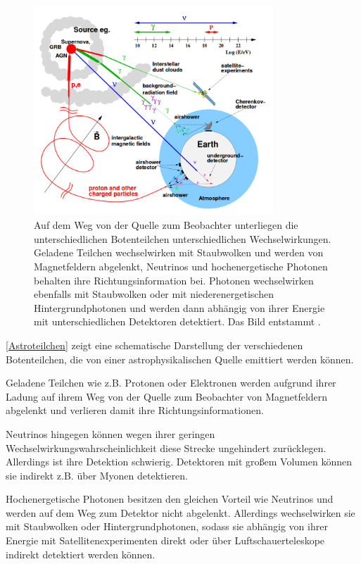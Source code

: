 \begin{figure}
    \centering
    \includegraphics[width=0.8\textwidth]{./Plots/02_Astroteilchenphysik/Astroteilchen.png}
    \caption{Auf dem Weg von der Quelle zum Beobachter unterliegen die unterschiedlichen Botenteilchen unterschiedlichen Wechselwirkungen. 
    Geladene Teilchen wechselwirken mit Staubwolken und werden von Magnetfeldern abgelenkt, Neutrinos und hochenergetische Photonen behalten ihre Richtungsinformation bei.
    Photonen wechselwirken ebenfalls mit Staubwolken oder mit niederenergetischen Hintergrundphotonen und werden dann abhängig von ihrer Energie mit unterschiedlichen Detektoren detektiert. 
    Das Bild entstammt \cite{DissMarlene}.}
    \label{Astroteilchen}
\end{figure}


\autoref{Astroteilchen} zeigt eine schematische Darstellung der verschiedenen Botenteilchen, die von einer astrophysikalischen Quelle emittiert werden können.

Geladene Teilchen wie z.B. Protonen oder Elektronen werden aufgrund ihrer Ladung auf ihrem Weg von der Quelle zum Beobachter von Magnetfeldern abgelenkt und verlieren damit ihre Richtungsinformationen.

Neutrinos hingegen können wegen ihrer geringen Wechselwirkungswahrscheinlichkeit diese Strecke ungehindert zurücklegen. 
Allerdings ist ihre Detektion schwierig.
Detektoren mit großem Volumen können sie indirekt z.B. über Myonen detektieren.

Hochenergetische Photonen besitzen den gleichen Vorteil wie Neutrinos und werden auf dem Weg zum Detektor nicht abgelenkt.
Allerdings wechselwirken sie mit Staubwolken oder Hintergrundphotonen, sodass sie abhängig von ihrer Energie mit Satellitenexperimenten direkt oder über Luftschauerteleskope indirekt detektiert werden können.

